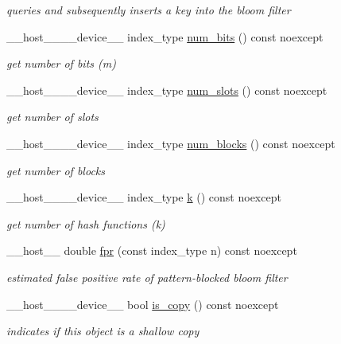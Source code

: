 \begin{DoxyCompactItemize}
\begin{DoxyCompactList}\small\item\em queries and subsequently inserts a key into the bloom filter \end{DoxyCompactList}\item 
\+\_\+\+\_\+host\+\_\+\+\_\+\+\_\+\+\_\+device\+\_\+\+\_\+ index\+\_\+type \hyperlink{classwarpcore_1_1BloomFilter_a54a25926cf770e834c47ad5164e91443}{num\+\_\+bits} () const noexcept
\begin{DoxyCompactList}\small\item\em get number of bits (m) \end{DoxyCompactList}\item 
\+\_\+\+\_\+host\+\_\+\+\_\+\+\_\+\+\_\+device\+\_\+\+\_\+ index\+\_\+type \hyperlink{classwarpcore_1_1BloomFilter_a1ab7ecd7bcc3f6321a252f94d63965eb}{num\+\_\+slots} () const noexcept
\begin{DoxyCompactList}\small\item\em get number of slots \end{DoxyCompactList}\item 
\+\_\+\+\_\+host\+\_\+\+\_\+\+\_\+\+\_\+device\+\_\+\+\_\+ index\+\_\+type \hyperlink{classwarpcore_1_1BloomFilter_a10fcbb540441eff40a1d0fccd1b992bd}{num\+\_\+blocks} () const noexcept
\begin{DoxyCompactList}\small\item\em get number of blocks \end{DoxyCompactList}\item 
\+\_\+\+\_\+host\+\_\+\+\_\+\+\_\+\+\_\+device\+\_\+\+\_\+ index\+\_\+type \hyperlink{classwarpcore_1_1BloomFilter_a33c972e8a462625d6253b58bbd5585f3}{k} () const noexcept
\begin{DoxyCompactList}\small\item\em get number of hash functions (k) \end{DoxyCompactList}\item 
\+\_\+\+\_\+host\+\_\+\+\_\+ double \hyperlink{classwarpcore_1_1BloomFilter_a27b98847aa06d277c48068ff59ca9381}{fpr} (const index\+\_\+type n) const noexcept
\begin{DoxyCompactList}\small\item\em estimated false positive rate of pattern-\/blocked bloom filter \end{DoxyCompactList}\item 
\+\_\+\+\_\+host\+\_\+\+\_\+\+\_\+\+\_\+device\+\_\+\+\_\+ bool \hyperlink{classwarpcore_1_1BloomFilter_a55aaae73d8a1a8d811779fcf372f6c8c}{is\+\_\+copy} () const noexcept
\begin{DoxyCompactList}\small\item\em indicates if this object is a shallow copy \end{DoxyCompactList}\end{DoxyCompactItemize}
